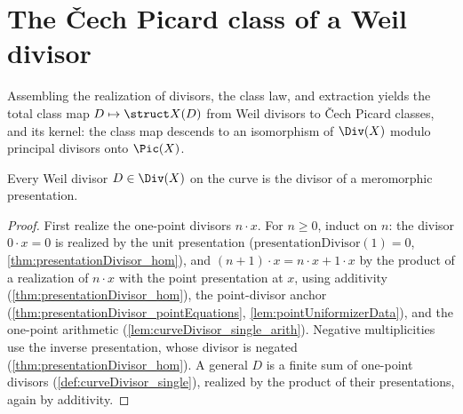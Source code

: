 \section{The \v Cech Picard class of a Weil divisor}

Assembling the realization of divisors, the class law, and extraction yields the total class map
\(D \mapsto \struct X(D)\) from Weil divisors to \v Cech Picard classes, and its kernel: the class
map descends to an isomorphism of \(\Div(X)\) modulo principal divisors onto \(\Pic(X)\).

\begin{theorem}
  \label{thm:exists_presentationDivisor_eq}
  \leanok
  Every Weil divisor \(D \in \Div(X)\) on the curve is the divisor of a meromorphic presentation.
\end{theorem}
\begin{proof}
  \leanok
  First realize the one-point divisors \(n \cdot x\). For \(n \ge 0\), induct on \(n\): the divisor
  \(0 \cdot x = 0\) is realized by the unit presentation (\(\mathrm{presentationDivisor}(1) = 0\),
  \ref{thm:presentationDivisor_hom}), and \((n+1) \cdot x = n \cdot x + 1 \cdot x\) by the product
  of a realization of \(n \cdot x\) with the point presentation at \(x\), using additivity
  (\ref{thm:presentationDivisor_hom}), the point-divisor anchor
  (\ref{thm:presentationDivisor_pointEquations}, \ref{lem:pointUniformizerData}), and the one-point
  arithmetic (\ref{lem:curveDivisor_single_arith}). Negative multiplicities use the inverse
  presentation, whose divisor is negated (\ref{thm:presentationDivisor_hom}). A general \(D\) is a
  finite sum of one-point divisors (\ref{def:curveDivisor_single}), realized by the product of
  their presentations, again by additivity.
\end{proof}

